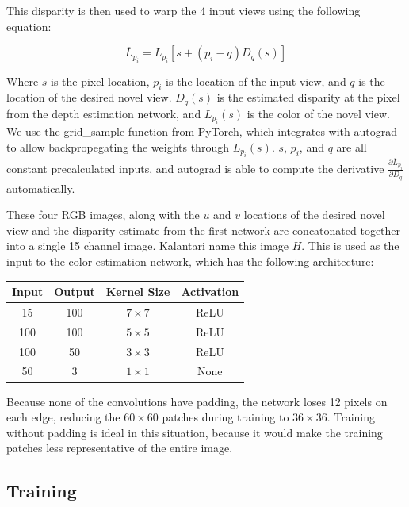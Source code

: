 \documentclass[10pt,twocolumn,letterpaper]{article}
\begin{document}
This disparity is then used to warp the 4 input views using the following equation:

$$
\overline{L}_{p_i} = L_{p_i} \left[ s + \left(p_i - q\right) D_q(s) \right]
$$

Where $s$ is the pixel location, $p_i$ is the location of the input view, and $q$ is the location of the
desired novel view. $D_q(s)$ is the estimated disparity at the pixel from the depth estimation network,
and $L_{p_i}(s)$ is the color of the novel view. We use the grid\_sample function from PyTorch, which integrates
with autograd to allow backpropegating the weights through $L_{p_i}(s)$. $s$, $p_i$, and $q$ are all 
constant precalculated inputs, and autograd is able to compute the derivative 
$\frac{\partial \overline{L}_{p_i}}{\partial D_q}$ automatically. 

These four RGB images, along with the $u$ and $v$ 
locations of the desired novel view and the disparity estimate from the first network are concatonated
together into a single 15 channel image. Kalantari \etal name this image $H$. This is used as the input to the color estimation network, which
has the following architecture:

\begin{center}
\begin{tabular}{|c c c c|}
    \hline
    Input & Output & Kernel Size & Activation \\
    \hline
    15 & 100 & $7 \times 7$ & ReLU \\
    100 & 100 & $5 \times 5$ & ReLU \\
    100 & 50 & $3 \times 3$ & ReLU \\
    50 & 3 & $1 \times 1$ & None \\
    \hline
\end{tabular}
\end{center}

Because none of the convolutions have padding, the network loses 12 pixels on each edge, reducing
the $60 \times 60$ patches during training to $36 \times 36$. Training without padding is ideal in this situation, 
because it would make the training patches less representative of the entire image.

\subsection{Training}
\end{document}

